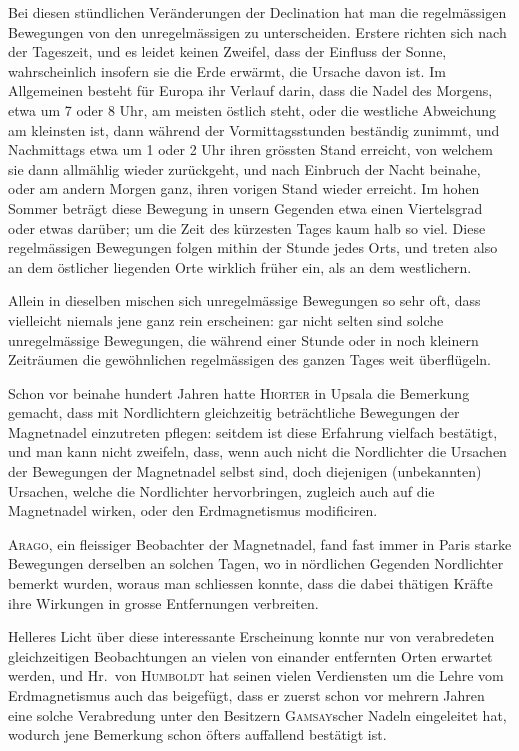 \documentclass[12pt,a4paper]{article}
\begin{document}
Bei diesen stündlichen Veränderungen der Declination hat man die regelmässigen Bewegungen von den unregelmässigen zu unterscheiden. Erstere richten sich nach der Tageszeit, und es leidet keinen Zweifel, dass der Einfluss der Sonne, wahrscheinlich insofern sie die Erde erwärmt, die Ursache davon ist. Im Allgemeinen besteht für Europa ihr Verlauf darin, dass die Nadel des Morgens, etwa um 7 oder 8 Uhr, am meisten östlich steht, oder die westliche Abweichung am kleinsten ist, dann während der Vormittagsstunden beständig zunimmt, und Nachmittags etwa um 1 oder 2 Uhr ihren grössten Stand erreicht, von welchem sie dann allmählig wieder zurückgeht, und nach Einbruch der Nacht beinahe, oder am andern Morgen ganz, ihren vorigen Stand wieder erreicht. Im hohen Sommer beträgt diese Bewegung in unsern Gegenden etwa einen Viertelsgrad oder etwas darüber; um die Zeit des kürzesten Tages kaum halb so viel. Diese regelmässigen Bewegungen folgen mithin der Stunde jedes Orts, und treten also an dem östlicher liegenden Orte wirklich früher ein, als an dem westlichern.

Allein in dieselben mischen sich unregelmässige Bewegungen so sehr oft, dass vielleicht niemals jene ganz rein erscheinen: gar nicht selten sind solche unregelmässige Bewegungen, die während einer Stunde oder in noch kleinern Zeiträumen die gewöhnlichen regelmässigen des ganzen Tages weit überflügeln.

Schon vor beinahe hundert Jahren hatte \textsc{Hiorter} in Upsala die Bemerkung gemacht, dass mit Nordlichtern gleichzeitig beträchtliche Bewegungen der Magnetnadel einzutreten pflegen: seitdem ist diese Erfahrung vielfach bestätigt, und man kann nicht zweifeln, dass, wenn auch nicht die Nordlichter die Ursachen der Bewegungen der Magnetnadel selbst sind, doch diejenigen (unbekannten) Ursachen, welche die Nordlichter hervorbringen, zugleich auch auf die Magnetnadel wirken, oder den Erdmagnetismus modificiren.

\textsc{Arago}, ein fleissiger Beobachter der Magnetnadel, fand fast immer in Paris starke Bewegungen derselben an solchen Tagen, wo in nördlichen Gegenden Nordlichter bemerkt wurden, woraus man schliessen konnte, dass die dabei thätigen Kräfte ihre Wirkungen in grosse Entfernungen verbreiten.

Helleres Licht über diese interessante Erscheinung konnte nur von verabredeten gleichzeitigen Beobachtungen an vielen von einander entfernten Orten erwartet werden, und Hr.~von \textsc{Humboldt} hat seinen vielen Verdiensten um die Lehre vom Erdmagnetismus auch das beigefügt, dass er zuerst schon vor mehrern Jahren eine solche Verabredung unter den Besitzern \textsc{Gamsay}scher Nadeln eingeleitet hat, wodurch jene Bemerkung schon öfters auffallend bestätigt ist.
\end{document}
